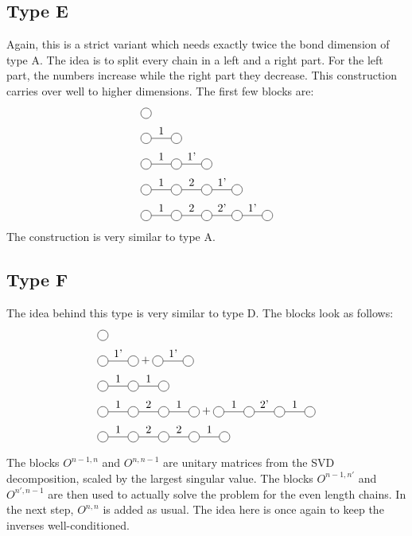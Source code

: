 \subsection{Type E}

Again, this is a strict variant which needs exactly twice the bond dimension of type A. The idea is to split every chain in a left and a right part. For the left part, the numbers increase while the right part they decrease. This construction carries over well to higher dimensions. The first few blocks are:
\begin{equation}
  \begin{split}
    &\mpob{1}{ {,}  }{}{}{}{{,,}} \\
    &\mpob{2}{ {,"1",}  }{}{}{}{{,,}}\\
    &\mpob{3}{ {,"1","1'",}  }{}{}{}{{,,,}}\\
    &\mpob{4}{ {,"1","2","1'",}  }{}{}{}{{,,,,,}}\\
    &\mpob{5}{ {,"1","2","2'","1'",}  }{}{}{}{{,,,,,}}\\
  \end{split}
\end{equation}
The construction is very similar to type A.

\subsection{Type F}

The idea behind this type is very similar to type D. The blocks look as follows:
\begin{equation}
  \begin{split}
    &\mpob{1}{ {,}  }{}{}{}{{,,}} \\
    &\mpob{2}{ {,"1'",}  }{}{}{}{{,,}}+\mpob{2}{ {,"1'",}  }{}{}{}{{,,}}\\
    &\mpob{3}{ {,"1","1",}  }{}{}{}{{,,,}}\\
    &\mpob{4}{ {,"1","2","1",}  }{}{}{}{{,,,,,}}+\mpob{4}{ {,"1","2'","1",}  }{}{}{}{{,,,,,}}\\
    &\mpob{5}{ {,"1","2","2","1",}  }{}{}{}{{,,,,,}}\\
  \end{split}
\end{equation}

The  blocks $O^{n-1,n}$ and $O^{n,n-1}$ are unitary matrices from the \Gls{SVD} decomposition, scaled by the largest singular value. The blocks $O^{n-1,n'}$ and $O^{n',n-1}$ are then used to actually solve the problem for the even length chains. In the next step, $O^{n,n}$ is added as usual. The idea here is once again to keep the inverses well-conditioned.

